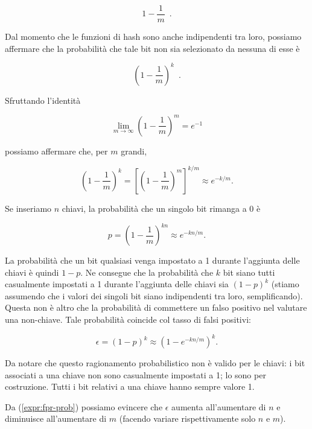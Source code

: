 \begin{equation}
    1 - \frac{1}{m} \enspace.
\end{equation}

Dal momento che le funzioni di hash sono anche indipendenti tra loro, possiamo affermare che la probabilità che tale bit non sia selezionato da nessuna di esse è 

\begin{equation}
    \left( 1 - \frac{1}{m} \right)^k \enspace.
\end{equation}

Sfruttando l'identità

\begin{equation}
    \lim_{m \to \infty} \left( 1 - \frac{1}{m} \right)^m = e^{-1}
\end{equation}

\noindent possiamo affermare che, per $m$ grandi, 

\begin{equation}
    \left( 1 - \frac{1}{m} \right)^k = \left[ \left( 1 - \frac{1}{m} \right)^m \right] ^ {k/m} \approx e^{-k/m} .
\end{equation}

Se inseriamo $n$ chiavi, la probabilità che un singolo bit rimanga a 0 è 

\begin{equation}
    p= \left( 1 - \frac{1}{m} \right)^{kn} \approx e^{-kn/m} .
\end{equation}

La probabilità che un bit qualsiasi venga impostato a 1 durante l'aggiunta delle chiavi è quindi $1-p$. Ne consegue che la probabilità che $k$ bit siano tutti casualmente impostati a 1 durante l'aggiunta delle chiavi sia $(1-p)^k$ (stiamo assumendo che i valori dei singoli bit siano indipendenti tra loro, semplificando).
Questa non è altro che la probabilità di commettere un falso positivo nel valutare una non-chiave. Tale probabilità coincide col tasso di falsi positivi:

\begin{equation}
    \epsilon = (1-p)^k \approx (1-e^{-kn/m})^k .
    \label{expr:fpr-prob}
\end{equation}

Da notare che questo ragionamento probabilistico non è valido per le chiavi: i bit associati a una chiave non sono casualmente impostati a 1; lo sono per costruzione. Tutti i bit relativi a una chiave hanno sempre valore 1.

Da (\ref{expr:fpr-prob}) possiamo evincere che $\epsilon$ aumenta all'aumentare di $n$ e diminuisce all'aumentare di $m$ (facendo variare rispettivamente solo $n$ e $m$).

